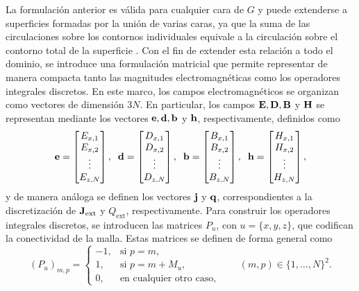 La formulación anterior es válida para cualquier cara de $G$ y puede extenderse a superficies formadas por la unión de varias caras, ya que la suma de las circulaciones sobre los contornos individuales equivale a la circulación sobre el contorno total de la superficie \cite{arfkenMathematicalMethodsPhysicists2011}. Con el fin de extender esta relación a todo el dominio, se introduce una formulación matricial que permite representar de manera compacta tanto las magnitudes electromagnéticas como los operadores integrales discretos.
En este marco, los campos electromagnéticos se organizan como vectores de dimensión $3N$. En particular, los campos $\vb{E}, \vb{D}, \vb{B}$ y $\vb{H}$ se representan mediante los vectores $\vb{e}, \vb{d}, \vb{b}$ y $\vb{h}$, respectivamente, definidos como \cite{hadabSolutionMaxwellsEquation2023}
\begin{equation}
	\vb{e}=\begin{bmatrix}
		E_{x,1}\\
		E_{x,2}\\
		\vdots\\
		E_{z,N} 
	\end{bmatrix},\;\;
	\vb{d}=\begin{bmatrix}
		D_{x,1}\\
		D_{x,2}\\
		\vdots\\
		D_{z,N} 
	\end{bmatrix},\;\;
	\vb{b}=\begin{bmatrix}
		B_{x,1}\\
		B_{x,2}\\
		\vdots\\
		B_{z,N} 
	\end{bmatrix},\;\;
	\vb{h}=\begin{bmatrix}
		H_{x,1}\\
		H_{x,2}\\
		\vdots\\
		H_{z,N} 
	\end{bmatrix},
\end{equation}
%
y de manera análoga se definen los vectores $\vb{j}$ y $\vb{q}$, correspondientes a la discretización de $\vb{J}_{\text{ext}}$ y $Q_{\text{ext}}$, respectivamente. Para construir los operadores integrales discretos, se introducen las matrices $P_u$, con $u=\{x,y,z\}$, que codifican la conectividad de la malla. Estas matrices se definen de forma general como \cite{hadabSolutionMaxwellsEquation2023}
%
\begin{equation}
	(P_u)_{m,p}=
	\begin{cases}
		-1, & \text{si } p=m,\\
		1, & \text{si } p=m+M_u,\\
		0, & \text{en cualquier otro caso},
	\end{cases}
	\qquad (m,p)\in \{1,\dots,N\}^2.
\end{equation}
